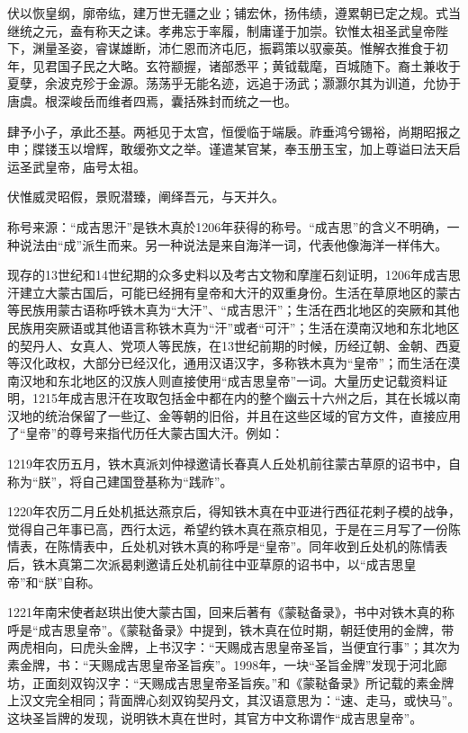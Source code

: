 {\fzk 伏以恢皇纲，廓帝纮，建万世无疆之业；铺宏休，扬伟绩，遵累朝已定之规。式当继统之元，盍有称天之诔。孝弗忘于率履，制庸谨于加崇。钦惟太祖圣武皇帝陛下，渊量圣姿，睿谋雄断，沛仁恩而济屯厄，振羁策以驭豪英。惟解衣推食于初年，见君国子民之大略。玄符颛握，诸部悉平；黄钺载麾，百城随下。裔土兼收于夏孽，余波克殄于金源。荡荡乎无能名迹，远追于汤武；灏灏尔其为训道，允协于唐虞。根深峻岳而维者四焉，囊括殊封而统之一也。

肆予小子，承此丕基。两袛见于太宫，恒僾临于端扆。祚垂鸿兮锡裕，尚期昭报之申；牒镂玉以增辉，敢缓弥文之举。谨遣某官某，奉玉册玉宝，加上尊谥曰法天启运圣武皇帝，庙号太祖。

伏惟威灵昭假，景贶潜臻，阐绎吾元，与天并久。}

称号来源：“成吉思汗”是铁木真於1206年获得的称号。“成吉思”的含义不明确，一种说法由“成”派生而来。另一种说法是来自海洋一词，代表他像海洋一样伟大。

现存的13世纪和14世纪期的众多史料以及考古文物和摩崖石刻证明，1206年成吉思汗建立大蒙古国后，可能已经拥有皇帝和大汗的双重身份。生活在草原地区的蒙古等民族用蒙古语称呼铁木真为“大汗”、“成吉思汗”；生活在西北地区的突厥和其他民族用突厥语或其他语言称铁木真为“汗”或者“可汗”；生活在漠南汉地和东北地区的契丹人、女真人、党项人等民族，在13世纪前期的时候，历经辽朝、金朝、西夏等汉化政权，大部分已经汉化，通用汉语汉字，多称铁木真为“皇帝”；而生活在漠南汉地和东北地区的汉族人则直接使用“成吉思皇帝”一词。大量历史记载资料证明，1215年成吉思汗在攻取包括金中都在内的整个幽云十六州之后，其在长城以南汉地的统治保留了一些辽、金等朝的旧俗，并且在这些区域的官方文件，直接应用了“皇帝”的尊号来指代历任大蒙古国大汗。例如：

1219年农历五月，铁木真派刘仲禄邀请长春真人丘处机前往蒙古草原的诏书中，自称为“朕”，将自己建国登基称为“践祚”。

1220年农历二月丘处机抵达燕京后，得知铁木真在中亚进行西征花剌子模的战争，觉得自己年事已高，西行太远，希望约铁木真在燕京相见，于是在三月写了一份陈情表，在陈情表中，丘处机对铁木真的称呼是“皇帝”。同年收到丘处机的陈情表后，铁木真第二次派曷剌邀请丘处机前往中亚草原的诏书中，以“成吉思皇帝”和“朕”自称。

1221年南宋使者赵珙出使大蒙古国，回来后著有《蒙鞑备录》，书中对铁木真的称呼是“成吉思皇帝”。《蒙鞑备录》中提到，铁木真在位时期，朝廷使用的金牌，带两虎相向，曰虎头金牌，上书汉字：“天赐成吉思皇帝圣旨，当便宜行事”；其次为素金牌，书：“天赐成吉思皇帝圣旨疾”。1998年，一块“圣旨金牌”发现于河北廊坊，正面刻双钩汉字：“天赐成吉思皇帝圣旨疾。”和《蒙鞑备录》所记载的素金牌上汉文完全相同；背面牌心刻双钩契丹文，其汉语意思为：“速、走马，或快马”。这块圣旨牌的发现，说明铁木真在世时，其官方中文称谓作“成吉思皇帝”。

